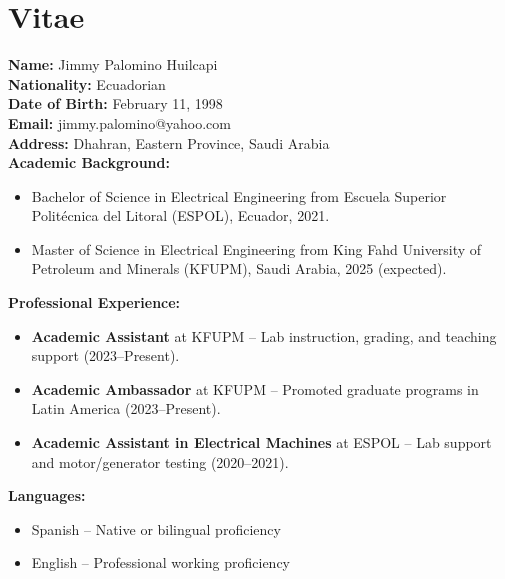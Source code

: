 \chapter*{Vitae}

\noindent
\textbf{Name:} Jimmy Palomino Huilcapi \\
\textbf{Nationality:} Ecuadorian \\
\textbf{Date of Birth:} February 11, 1998 \\
\textbf{Email:} jimmy.palomino@yahoo.com \\
\textbf{Address:} Dhahran, Eastern Province, Saudi Arabia \\

\vspace{1em}
\noindent
\textbf{Academic Background:}
\begin{itemize}
    \item Bachelor of Science in Electrical Engineering from Escuela Superior Politécnica del Litoral (ESPOL), Ecuador, 2021.
    \item Master of Science in Electrical Engineering from King Fahd University of Petroleum and Minerals (KFUPM), Saudi Arabia, 2025 (expected).
\end{itemize}

\vspace{1em}
\noindent
\textbf{Professional Experience:}
\begin{itemize}
    \item \textbf{Academic Assistant} at KFUPM – Lab instruction, grading, and teaching support (2023–Present).
    \item \textbf{Academic Ambassador} at KFUPM – Promoted graduate programs in Latin America (2023–Present).
    \item \textbf{Academic Assistant in Electrical Machines} at ESPOL – Lab support and motor/generator testing (2020–2021).
\end{itemize}


\vspace{1em}
\noindent
\textbf{Languages:}
\begin{itemize}
    \item Spanish – Native or bilingual proficiency
    \item English – Professional working proficiency
\end{itemize}
